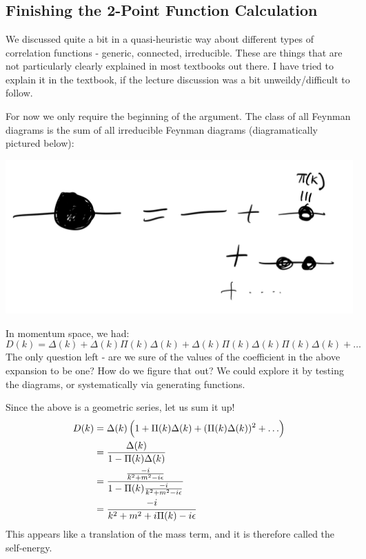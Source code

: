 \section{}

\subsection{Finishing the 2-Point Function Calculation}
We discussed quite a bit in a quasi-heuristic way about different types of correlation functions - generic, connected, irreducible. These are things that are not particularly clearly explained in most textbooks out there. I have tried to explain it in the textbook, if the lecture discussion was a bit unweildy/difficult to follow.

For now we only require the beginning of the argument. The class of all Feynman diagrams is the sum of all irreducible Feynman diagrams (diagramatically pictured below):

\begin{center}
    \includegraphics[scale=0.3]{Images/fig-lec28feynman1.png}
\end{center}


In momentum space, we had:
\begin{equation}
    D(k) = \Delta(k) + \Delta(k)\Pi(k)\Delta(k) + \Delta(k)\Pi(k)\Delta(k)\Pi(k)\Delta(k) + \ldots
\end{equation}
The only question left - are we sure of the values of the coefficient in the above expansion to be one? How do we figure that out? We could explore it by testing the diagrams, or systematically via generating functions.

Since the above is a geometric series, let us sum it up!
\begin{equation}
    \begin{split}
        D(k) &= \Delta(k)\left(1 + \Pi(k)\Delta(k) + (\Pi(k)\Delta(k))^2 + \ldots\right) 
        \\ &= \frac{\Delta(k)}{1 - \Pi(k)\Delta(k)} 
        \\ &=  \frac{\frac{-i}{k^2 + m^2 - i\epsilon}}{1 - \Pi(k)\frac{-i}{k^2 + m^2 - i\epsilon}}
        \\ &= \frac{-i}{k^2 + m^2 + i\Pi(k) - i\epsilon}
    \end{split}
\end{equation}
This appears like a translation of the mass term, and it is therefore called the self-energy.

